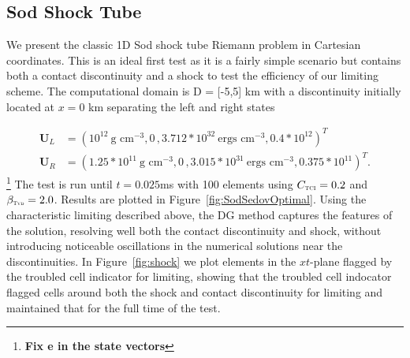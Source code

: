 \documentclass[onecolumn]{aastex62}
\newcommand{\TVD}{\textnormal{\tiny\textsc{Tvd}}}
\newcommand{\TCI}{\textnormal{\tiny\textsc{TCI}}}
\begin{document}
\subsection{Sod Shock Tube}
We present the classic 1D Sod shock tube Riemann problem \citep{sod:1978} in
Cartesian coordinates. This is an ideal first test as it is a fairly simple
scenario but contains both a contact discontinuity and a shock to test the
efficiency of our limiting scheme. The computational domain is D = [-5,5] km
with a discontinuity initially located at $x = 0$ km separating the left and right states

\begin{align*}
  \mathbf{U}_{L} &= (10^{12}~\text{g~cm}^{-3}, 0\,, 3.712*10^{32}~\text{ergs~cm}^{-3}, 0.4*10^{12})^T\,\,\, \\
  \mathbf{U}_{R} &= (1.25*10^{11}~\text{g~cm}^{-3}, 0\, , 3.015*10^{31}~\text{ergs~cm}^{-3}, 0.375*10^{11})^T.
\end{align*}
\footnote{\textbf{Fix e in the state vectors}}
\noindent The test is run until $t = 0.025$ms with 100 elements
using $C_{\TCI} = 0.2$ and $\beta_{\TVD} = 2.0$. Results are plotted in
Figure~\ref{fig:SodSedovOptimal}. Using the characteristic limiting described
above, the DG method captures the features of the solution,
resolving well both the contact discontinuity and shock, without introducing
noticeable oscillations in the numerical solutions near the discontinuities.
In Figure~\ref{fig:shock}
we plot elements in the $xt$-plane flagged by the troubled cell indicator for
limiting, showing that the troubled cell indocator flagged cells around both
the shock and contact discontinuity for limiting and maintained that
for the full time of the test.
\end{document}
